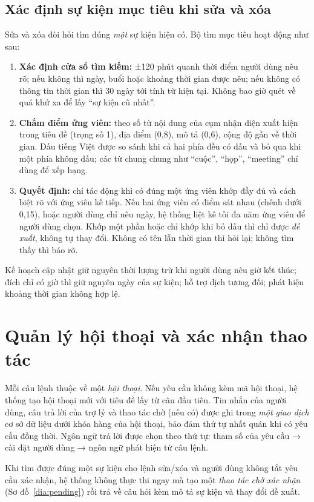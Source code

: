 \subsection{Xác định sự kiện mục tiêu khi sửa và xóa}
Sửa và xóa đòi hỏi tìm đúng \textit{một} sự kiện hiện có. Bộ tìm mục tiêu hoạt động như sau:
\begin{enumerate}
  \item \textbf{Xác định cửa sổ tìm kiếm:} ±120 phút quanh thời điểm người dùng nêu rõ; nếu không thì ngày, buổi hoặc khoảng thời gian được nêu; nếu không có thông tin thời gian thì 30 ngày tới tính từ hiện tại. Không bao giờ quét về quá khứ xa để lấy “sự kiện cũ nhất”.
  \item \textbf{Chấm điểm ứng viên:} theo số từ nội dung của cụm nhận diện xuất hiện trong tiêu đề (trọng số 1), địa điểm (0,8), mô tả (0,6), cộng độ gần về thời gian. Dấu tiếng Việt được so sánh khi cả hai phía đều có dấu và bỏ qua khi một phía không dấu; các từ chung chung như “cuộc”, “họp”, “meeting” chỉ dùng để xếp hạng.
  \item \textbf{Quyết định:} chỉ tác động khi có đúng một ứng viên khớp đầy đủ và cách biệt rõ với ứng viên kế tiếp. Nếu hai ứng viên có điểm sát nhau (chênh dưới 0,15), hoặc người dùng chỉ nêu ngày, hệ thống liệt kê tối đa năm ứng viên để người dùng chọn. Khớp một phần hoặc chỉ khớp khi bỏ dấu thì chỉ được \textit{đề xuất}, không tự thay đổi. Không có tên lẫn thời gian thì hỏi lại; không tìm thấy thì báo rõ.
\end{enumerate}
Kế hoạch cập nhật giữ nguyên thời lượng trừ khi người dùng nêu giờ kết thúc; đích chỉ có giờ thì giữ nguyên ngày của sự kiện; hỗ trợ dịch tương đối; phát hiện khoảng thời gian không hợp lệ.

\section{Quản lý hội thoại và xác nhận thao tác}\label{sec:dialog-design}
Mỗi câu lệnh thuộc về một \textit{hội thoại}. Nếu yêu cầu không kèm mã hội thoại, hệ thống tạo hội thoại mới với tiêu đề lấy từ câu đầu tiên. Tin nhắn của người dùng, câu trả lời của trợ lý và thao tác chờ (nếu có) được ghi trong \textit{một giao dịch} cơ sở dữ liệu dưới khóa hàng của hội thoại, bảo đảm thứ tự nhất quán khi có yêu cầu đồng thời. Ngôn ngữ trả lời được chọn theo thứ tự: tham số của yêu cầu → cài đặt người dùng → ngôn ngữ phát hiện từ câu lệnh.

Khi tìm được đúng một sự kiện cho lệnh sửa/xóa và người dùng không tắt yêu cầu xác nhận, hệ thống không thực thi ngay mà tạo một \textit{thao tác chờ xác nhận} (Sơ đồ~\ref{dia:pending}) rồi trả về câu hỏi kèm mô tả sự kiện và thay đổi đề xuất.


